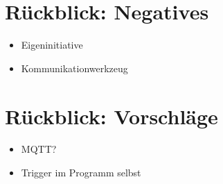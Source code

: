 \documentclass[ignorenonframetext, 11pt, table]{beamer}
\begin{document}
\section{Rückblick: Negatives}
\begin{frame}
\begin{itemize}
\item Eigeninitiative\pause
\item Kommunikationwerkzeug
\end{itemize}
\end{frame}


\section{Rückblick: Vorschläge}
\begin{frame}
\begin{itemize}
\item MQTT?\pause
\item Trigger im Programm selbst
\end{itemize}
\end{frame}
\end{document}
